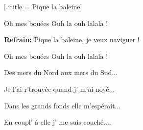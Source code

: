  [
ititle = {Pique la baleine}]


\beginverse
{} {Oh mes bouées} {Ouh la ouh lalala !}
\endverse

\beginchorus
\textbf {Refrain:}
 {Pique la baleine, je veux naviguer !}
\endchorus

\beginverse
{} {Oh mes bouées} {Ouh la ouh lalala !}
\endverse

\beginverse
Des mers du Nord aux mers du Sud...
\endverse

\beginverse
Je l'ai r'trouvée quand j' m'ai noyé...
\endverse

\beginverse
Dans les grands fonds elle m'espérait...
\endverse

\beginverse
En coupl' à elle j' me suis couché....
\endverse

\beginverse